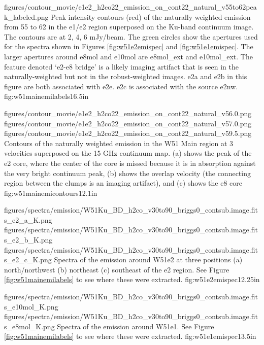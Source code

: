 \Figure
{figures/contour_movie/e1e2_h2co22_emission_on_cont22_natural_v55to62peak_labeled.png}
{ Peak intensity contours (red) of the naturally weighted \formaldehyde \twotwo
emission from 55 to 62 \kms in the e1/e2 region superposed on the Ku-band
continuum image.  The contours are at 2, 4, 6 mJy/beam.  The green circles show
the apertures used for the spectra shown in Figures
\ref{fig:w51e2emispec} and
\ref{fig:w51e1emispec}.  The larger apertures around e8mol and e10mol are
e8mol\_ext and e10mol\_ext.  The feature denoted `e2-e8 bridge' is a likely
imaging artifact that is seen in the naturally-weighted but not in the
robust-weighted images.  e2a and e2b in this figure are both associated with
\citet{Shi2010a} e2e.  e2c is associated with the source e2nw.
}{fig:w51mainemilabels}{1}{6.5in}

\FigureThreeAA
{figures/contour_movie/e1e2_h2co22_emission_on_cont22_natural_v56.0.png}
{figures/contour_movie/e1e2_h2co22_emission_on_cont22_natural_v57.0.png}
{figures/contour_movie/e1e2_h2co22_emission_on_cont22_natural_v59.5.png}
{Contours of the \formaldehyde \twotwo naturally weighted emission in the W51
Main region at 3 velocities superposed on the 15 GHz continuum map.  (a) shows
the peak of the e2 core, where the center of the core is missed because it is
in absorption against the very bright continuum peak, (b) shows the overlap
velocity (the connecting region between the clumps is an imaging artifact), and
(c) shows the e8 core}
{fig:w51mainemicontours}{1}{2.1in}

\FigureThreeAA
{figures/spectra/emission/W51Ku_BD_h2co_v30to90_briggs0_contsub.image.fits_e2_a_K.png}
{figures/spectra/emission/W51Ku_BD_h2co_v30to90_briggs0_contsub.image.fits_e2_b_K.png}
{figures/spectra/emission/W51Ku_BD_h2co_v30to90_briggs0_contsub.image.fits_e2_c_K.png}
{Spectra of the \twotwo emission around W51e2 at three positions (a)
north/northwest (b) northeast (c) southeast of the e2 \hchii region.  See Figure
\ref{fig:w51mainemilabels} to see where these were extracted.}
{fig:w51e2emispec}{1}{2.25in}

\FigureTwoAA
{figures/spectra/emission/W51Ku_BD_h2co_v30to90_briggs0_contsub.image.fits_e10mol_K.png}
{figures/spectra/emission/W51Ku_BD_h2co_v30to90_briggs0_contsub.image.fits_e8mol_K.png}
{Spectra of the \twotwo emission around W51e1.  See Figure
\ref{fig:w51mainemilabels} to see where these were extracted.
}
{fig:w51e1emispec}{1}{3.5in}



